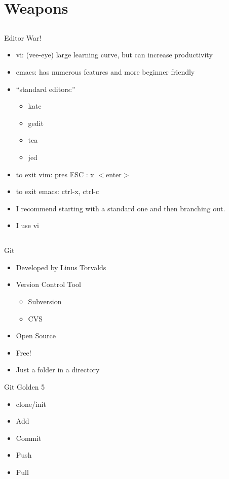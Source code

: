 \documentclass{beamer}
\begin{document}
\section{Weapons}
\subsection{}

\begin{frame}{Editor War!}
\begin{itemize}
\item vi: (vee-eye) large learning curve, but can increase productivity
\item emacs: has numerous features and more beginner friendly
\item ``standard editors:''
\begin{itemize}
\item kate
\item gedit
\item tea
\item jed
\end{itemize}
\item to exit vim: pres ESC : x $<$enter$>$
\item to exit emacs: ctrl-x, ctrl-c
\item I recommend starting with a standard one and then branching out.
\item I use vi
\end{itemize}
\end{frame}

\subsection{}
\begin{frame}{Git}
\begin{itemize}
\item Developed by Linus Torvalds
\item Version Control Tool
\begin{itemize}
\item Subversion
\item CVS
\end{itemize}
\item Open Source 
\item Free!
\item Just a folder in a directory
\end{itemize}
\end{frame}

\begin{frame}{Git Golden 5}
\begin{itemize}
\item clone/init
\item Add
\item Commit
\item Push
\item Pull
\end{itemize}
\end{frame}
\end{document}

